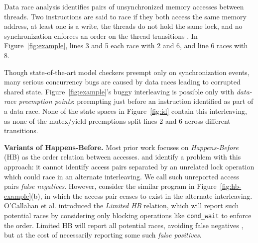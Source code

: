 Data race analysis \cite{eraser} identifies pairs of unsynchronized memory accesses between threads.
Two instructions are said to race if
they both access the same memory address,
at least one is a write,
the threads do not hold the same lock,
and no synchronization enforces an order on the thread transitions .
In Figure~\ref{fig:example}, lines 3 and 5 each race with 2 and 6, and line 6 races with 8.



Though state-of-the-art model checkers preempt only on synchronization events,
many serious concurrency bugs are caused by data races leading to corrupted shared state.
Figure~\ref{fig:example}'s buggy interleaving is possible only with {\em data-race preemption points}:
preempting just before an instruction identified as part of a data race.
None of the state spaces in Figure~\ref{fig:id} contain this interleaving,
as none of the mutex/yield preemptions split lines 2 and 6 across different transitions.

	{\bf Variants of Happens-Before.}
	Most prior work focuses on {\em Happens-Before} (HB) \cite{lamport-clocks,djit,fasttrack} as the order relation between accesses.
\cite{predictive-dr} and \cite{hybriddatarace} identify a problem with this approach:
it cannot identify access pairs separated by an unrelated lock operation which could race in an alternate interleaving.
We call such unreported access pairs {\em false negatives}.
However, consider the similar program in Figure~\ref{fig:hb-example}(b),
in which the access pair ceases to exist in the alternate interleaving.
O'Callahan et al. \cite{hybriddatarace} introduced the {\em Limited HB} relation,
which will report such potential races
by considering only blocking operations like {\tt cond\_wait} to enforce the order.
Limited HB will report all potential races, avoiding  false negatives \cite{tsan},
but at the cost of necessarily reporting some such {\em false positives}.

